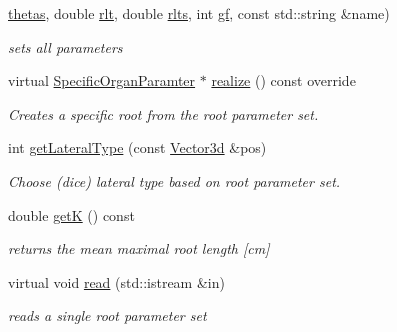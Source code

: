 \begin{DoxyCompactItemize}
\hyperlink{classCPlantBox_1_1RootRandomOrganParameter_ac1d64e772d445b1548f46f72fe663120}{thetas}, double \hyperlink{classCPlantBox_1_1RootRandomOrganParameter_a6ed82d7f234944e5d9c9acbfdabe021e}{rlt}, double \hyperlink{classCPlantBox_1_1RootRandomOrganParameter_aa1b3e5e603bf9e155aaa9cbf22cc9f20}{rlts}, int \hyperlink{classCPlantBox_1_1RootRandomOrganParameter_a5aa0513e96b4f00c2de2999cc731ff17}{gf}, const std\+::string \&name)
\begin{DoxyCompactList}\small\item\em sets all parameters \end{DoxyCompactList}\item 
virtual \hyperlink{classCPlantBox_1_1SpecificOrganParamter}{Specific\+Organ\+Paramter} $\ast$ \hyperlink{classCPlantBox_1_1RootRandomOrganParameter_a3da96f71d26370fea15a91114f3076f8}{realize} () const override
\begin{DoxyCompactList}\small\item\em Creates a specific root from the root parameter set. \end{DoxyCompactList}\item 
int \hyperlink{classCPlantBox_1_1RootRandomOrganParameter_ade495f4945b55f108b5f2d6a5ca1f559}{get\+Lateral\+Type} (const \hyperlink{classCPlantBox_1_1Vector3d}{Vector3d} \&pos)
\begin{DoxyCompactList}\small\item\em Choose (dice) lateral type based on root parameter set. \end{DoxyCompactList}\item 
\mbox{\label{classCPlantBox_1_1RootRandomOrganParameter_aac0b0cc5b9a93c7bea94689fc634fa02}} 
double \hyperlink{classCPlantBox_1_1RootRandomOrganParameter_aac0b0cc5b9a93c7bea94689fc634fa02}{getK} () const
\begin{DoxyCompactList}\small\item\em returns the mean maximal root length \mbox{[}cm\mbox{]} \end{DoxyCompactList}\item 
\mbox{\label{classCPlantBox_1_1RootRandomOrganParameter_afb92fe5ce189e665f38c56e2fb3c4273}} 
virtual void \hyperlink{classCPlantBox_1_1RootRandomOrganParameter_afb92fe5ce189e665f38c56e2fb3c4273}{read} (std\+::istream \&in)
\begin{DoxyCompactList}\small\item\em reads a single root parameter set \end{DoxyCompactList}\item 

\end{DoxyCompactItemize}

